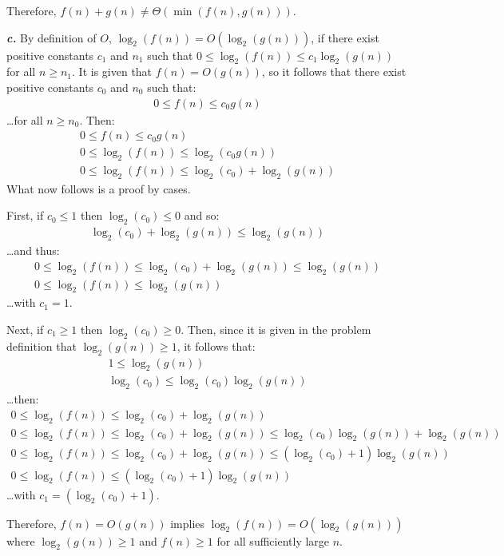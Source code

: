 Therefore, $f(n) + g(n) \neq \Theta(\min(f(n),g(n)))$.

\noindent\textbf{\textit{c.}} By definition of $O$, $\log_2(f(n)) = O(\log_2(g(n)))$, if there exist positive constants $c_1$ and $n_1$ such that $0 \leq \log_2(f(n)) \leq c_1 \log_2(g(n))$ for all $n \geq n_1$. It is given that $f(n) = O(g(n))$, so it follows that there exist positive constants $c_0$ and $n_0$ such that:
\begin{eqnarray*}
	0 \leq f(n) \leq c_0 g(n)
\end{eqnarray*}
\ldots for all $n \geq n_0$. Then:
\begin{eqnarray*}
	0 \leq f(n) \leq c_0 g(n) \\
	0 \leq \log_2(f(n)) \leq \log_2(c_0g(n)) \\
	0 \leq \log_2(f(n)) \leq \log_2(c_0) + \log_2(g(n))
\end{eqnarray*}
What now follows is a proof by cases.

First, if $c_0 \leq 1$ then $\log_2(c_0) \leq 0$ and so:
\begin{eqnarray*}
	\log_2(c_0) + \log_2(g(n)) \leq \log_2(g(n))
\end{eqnarray*}
\ldots and thus:
\begin{eqnarray*}
	0 \leq \log_2(f(n)) \leq \log_2(c_0) + \log_2(g(n)) \leq \log_2(g(n)) \\
	0 \leq \log_2(f(n)) \leq \log_2(g(n))
\end{eqnarray*}
\ldots with $c_1 = 1$.

Next, if $c_1 \geq 1$ then $\log_2(c_0) \geq 0$. Then, since it is given in the problem definition that $\log_2(g(n)) \geq 1$, it follows that:
\begin{eqnarray*}
	1 \leq \log_2(g(n)) \\
	\log_2(c_0) \leq \log_2(c_0)\log_2(g(n))
\end{eqnarray*}
\ldots then:
\begin{eqnarray*}
	0 \leq \log_2(f(n)) \leq \log_2(c_0) + \log_2(g(n)) \\
	0 \leq \log_2(f(n)) \leq \log_2(c_0) + \log_2(g(n)) \leq \log_2(c_0)\log_2(g(n)) + \log_2(g(n)) \\
	0 \leq \log_2(f(n)) \leq \log_2(c_0) + \log_2(g(n)) \leq (\log_2(c_0) + 1)\log_2(g(n)) \\
	0 \leq \log_2(f(n)) \leq (\log_2(c_0) + 1)\log_2(g(n))
\end{eqnarray*}
\ldots with $c_1 = (\log_2(c_0) + 1)$.

Therefore, $f(n) = O(g(n))$ implies $\log_2(f(n)) = O(\log_2(g(n)))$ where $\log_2(g(n)) \geq 1$ and $f(n) \geq 1$ for all sufficiently large $n$.


